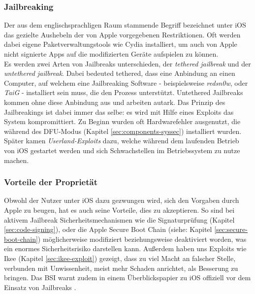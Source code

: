 	\subsubsection{Jailbreaking}\label{sec:jailbreaking}
		Der aus dem englischsprachligen Raum stammende Begriff bezeichnet unter iOS
		das gezielte Aushebeln der von Apple vorgegebenen Restriktionen. Oft werden
		dabei eigene Paketverwaltungstools wie
		Cydia \cite{Cydia2015} installiert, um auch von Apple nicht
		signierte Apps auf die modifizierten Geräte aufspielen zu können.\\
		Es werden zwei Arten von Jailbreaks unterschieden, der \textsl{tethered
		jailbreak} und der \textsl{untethered jailbreak}. Dabei bedeuted tethered,
		dass eine Anbindung an einen Computer, auf welchem eine Jailbreaking Software
		- beispielsweise \textsl{redsn0w}, oder	\textsl{TaiG} - installiert sein muss, die
		den Prozess unterstützt. Untethered Jailbreaks kommen ohne diese Anbindung aus
		und arbeiten autark. Das Prinzip des Jailbreakings ist dabei immer das selbe:
		es wird mit Hilfe eines Exploits das System kompromittiert. Zu Beginn wurden oft
		Hardwarefehler ausgenutzt, die während des
		DFU-Modus (Kapitel \ref{sec:components-syssec}) installiert wurden.
		Später kamen \textsl{Userland-Exploits} dazu, welche während dem
		laufenden Betrieb von iOS gestartet werden und sich Schwachstellen im
		Betriebssystem zu nutze machen.
	
	\subsubsection{Vorteile der Proprietät}
		Obwohl der Nutzer unter iOS dazu gezwungen wird, sich den Vorgaben durch Apple
		zu beugen, hat es auch seine Vorteile, dies zu akzeptieren. So sind bei
		aktivem Jailbreak Sicherheitsmechanismen wie die Signaturprüfung (Kapitel
		\ref{sec:code-signing}), oder die Apple Secure Boot	Chain (siehe: Kapitel
		\ref{sec:secure-boot-chain}) möglicherweise modifiziert beziehungsweise
		deaktiviert worden, was ein enormes Sicherheitsrisiko darstellen kann.
		Außerdem haben uns Exploits wie Ikee (Kapitel \ref{sec:ikee-exploit})
		gezeigt, dass zu viel Macht an falscher Stelle, verbunden mit Unwissenheit,
		meist mehr Schaden anrichtet, als Besserung zu bringen. Das BSI warnt
		zudem in einem Überblickspapier zu iOS offiziell vor dem Einsatz von
		Jailbreaks \cite{BSIJailbreak2013}.

